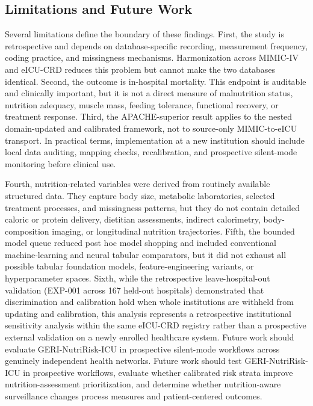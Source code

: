 \documentclass[utf8]{FrontiersinVancouver}
\begin{document}
\subsection{Limitations and Future Work}
Several limitations define the boundary of these findings. First, the study is retrospective and depends on database-specific recording, measurement frequency, coding practice, and missingness mechanisms. Harmonization across MIMIC-IV and eICU-CRD reduces this problem but cannot make the two databases identical. Second, the outcome is in-hospital mortality. This endpoint is auditable and clinically important, but it is not a direct measure of malnutrition status, nutrition adequacy, muscle mass, feeding tolerance, functional recovery, or treatment response. Third, the APACHE-superior result applies to the nested domain-updated and calibrated framework, not to source-only MIMIC-to-eICU transport. In practical terms, implementation at a new institution should include local data auditing, mapping checks, recalibration, and prospective silent-mode monitoring before clinical use.

Fourth, nutrition-related variables were derived from routinely available structured data. They capture body size, metabolic laboratories, selected treatment processes, and missingness patterns, but they do not contain detailed caloric or protein delivery, dietitian assessments, indirect calorimetry, body-composition imaging, or longitudinal nutrition trajectories. Fifth, the bounded model queue reduced post hoc model shopping and included conventional machine-learning and neural tabular comparators, but it did not exhaust all possible tabular foundation models, feature-engineering variants, or hyperparameter spaces. Sixth, while the retrospective leave-hospital-out validation (EXP-001 across 167 held-out hospitals) demonstrated that discrimination and calibration hold when whole institutions are withheld from updating and calibration, this analysis represents a retrospective institutional sensitivity analysis within the same eICU-CRD registry rather than a prospective external validation on a newly enrolled healthcare system. Future work should evaluate GERI-NutriRisk-ICU in prospective silent-mode workflows across genuinely independent health networks. Future work should test GERI-NutriRisk-ICU in prospective workflows, evaluate whether calibrated risk strata improve nutrition-assessment prioritization, and determine whether nutrition-aware surveillance changes process measures and patient-centered outcomes.
\end{document}
